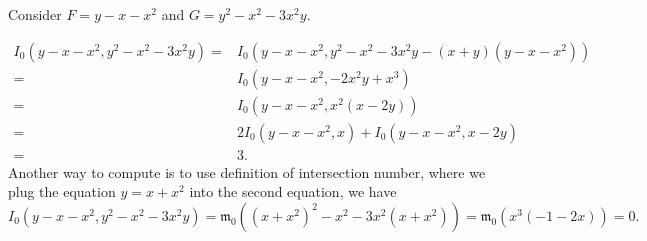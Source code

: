 \documentclass[10pt]{article}
\begin{document}
\begin{example}
  Consider $ F = y - x - x^{2}$ and $ G = y^{2} - x^{2} - 3 x^{2}y$.
\end{example}
\begin{solution}
  \begin{equation*}
    \begin{aligned}
      I_{0}(y-x- x^{2} , y^{2} - x^{2} - 3 x^{2}y) = & I_{0}(y - x - x^{2} , y^{2} - x^{2} - 3 x^{2}y - (x+y)(y - x - x^{2})) \\
      = & I_{0}(y - x - x^{2} , - 2 x^{2}y + x^{3}) \\
      = & I_0(y - x - x^{2}, x^{2} (x - 2y)) \\
      = & 2 I_0(y - x - x^{2}, x) + I_0(y - x - x^{2}, x - 2y) \\
      = & 3.
    \end{aligned}
  \end{equation*}
  Another way to compute is to use definition of intersection number, where we plug the equation $ y = x+x^{2}$ into the second equation, we have
  \begin{equation*}
    I_{0}(y - x - x^{2} , y^{2} - x^{2} - 3 x^{2}y) = \mathfrak{m}_0\left( (x+x^{2})^{2} - x^{2} - 3 x^{2}(x+x^{2}) \right) = \mathfrak{m}_0 \left( x^{3}(-1-2x) \right) = 0.
  \end{equation*}
\end{solution}

\label{LastPage}
\end{document}
